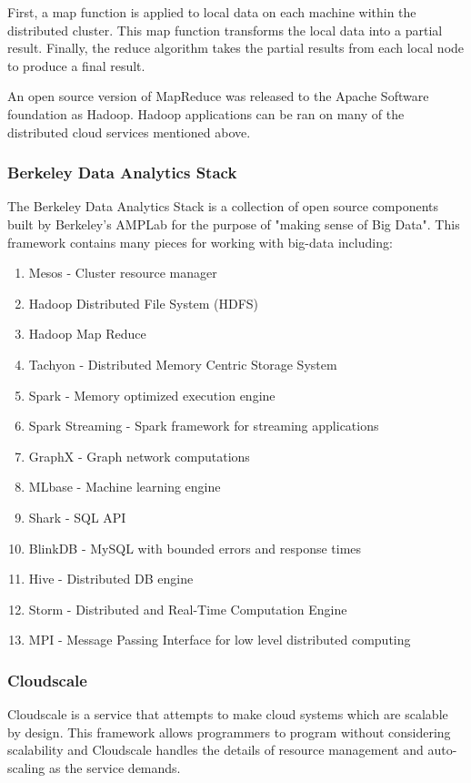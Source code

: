 First, a map function is applied to local data on each machine within the distributed cluster. This map function transforms the local data into a partial result. Finally, the reduce algorithm takes the partial results from each local node to produce a final result.

An open source version of MapReduce was released to the Apache Software foundation as Hadoop. Hadoop applications can be ran on many of the distributed cloud services mentioned above.

\subsubsection{Berkeley Data Analytics Stack}
The Berkeley Data Analytics Stack is a collection of open source components built by Berkeley's AMPLab for the purpose of "making sense of Big Data". This framework contains many pieces for working with big-data including:

\begin{enumerate}
  \item{Mesos - Cluster resource manager}
  \item{Hadoop Distributed File System (HDFS)}
  \item{Hadoop Map Reduce}
  \item{Tachyon - Distributed Memory Centric Storage System}
  \item{Spark - Memory optimized execution engine}
  \item{Spark Streaming - Spark framework for streaming applications}
  \item{GraphX - Graph network computations}
  \item{MLbase - Machine learning engine}
  \item{Shark - SQL API}
  \item{BlinkDB - MySQL with bounded errors and response times}
  \item{Hive - Distributed DB engine}
  \item{Storm - Distributed and Real-Time Computation Engine}
  \item{MPI - Message Passing Interface for low level distributed computing}
\end{enumerate}

\subsubsection{Cloudscale}
Cloudscale is a service that attempts to make cloud systems which are scalable by design. This framework allows programmers to program without considering scalability and Cloudscale handles the details of resource management and auto-scaling as the service demands.


